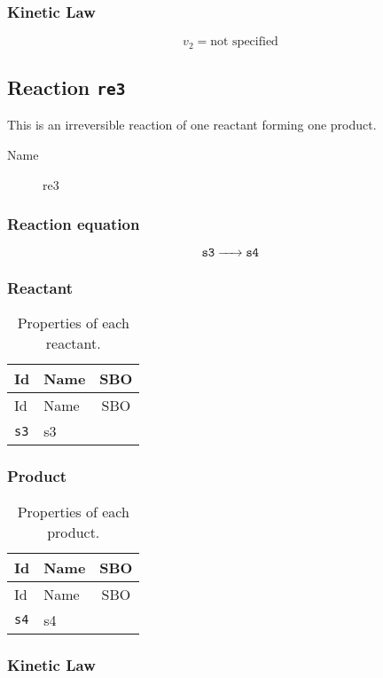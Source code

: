 \documentclass[11pt,twoside,a4paper]{scrartcl}
\newcommand{\reaction}[1]{\begin{equation}\ce{#1}\end{equation}}
\begin{document}
\subsubsection*{Kinetic Law}

\begin{dmath}
v_{2}=\text{not specified}
\label{v2}
\end{dmath}

\subsection{Reaction \texttt{re3}}
This is an irreversible reaction of one reactant forming one product.\begin{description}
\item[Name] re3
\end{description}

\subsubsection*{Reaction equation}
\reaction{ $\mathtt{s3}$ ->  $\mathtt{s4}$}

\subsubsection*{Reactant}
\begin{longtable}[h!]{llc}
\caption{Properties of each reactant.}\\
\toprule
Id & Name & SBO\\
\midrule
\endfirsthead
\toprule
Id & Name & SBO\\
\midrule
\endhead
\texttt{s3}&s3&\\
\bottomrule\end{longtable}

\subsubsection*{Product}
\begin{longtable}[h!]{llc}
\caption{Properties of each product.}\\
\toprule
Id & Name & SBO\\
\midrule
\endfirsthead
\toprule
Id & Name & SBO\\
\midrule
\endhead
\texttt{s4}&s4&\\
\bottomrule\end{longtable}

\subsubsection*{Kinetic Law}
\end{document}
